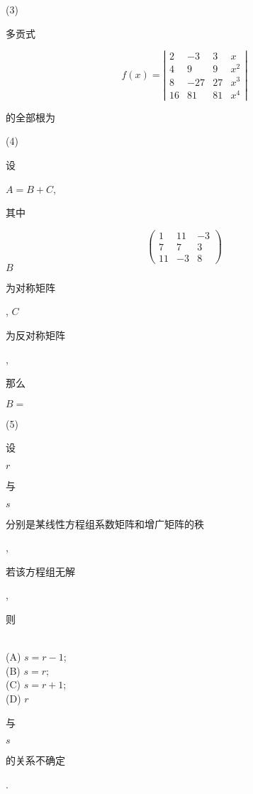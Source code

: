 \documentclass[10pt]{article}
\begin{document}
(3) \begin{CJK}{UTF8}{mj}多贡式\end{CJK}
$$
f(x)=\left|\begin{array}{cccc}
2 & -3 & 3 & x \\
4 & 9 & 9 & x^{2} \\
8 & -27 & 27 & x^{3} \\
16 & 81 & 81 & x^{4}
\end{array}\right|
$$
\begin{CJK}{UTF8}{mj}的全部根为\end{CJK}

(4) \begin{CJK}{UTF8}{mj}设\end{CJK} $A=B+C$, \begin{CJK}{UTF8}{mj}其中\end{CJK}
$$
\left(\begin{array}{ccc}
1 & 11 & -3 \\
7 & 7 & 3 \\
11 & -3 & 8
\end{array}\right)
$$
$B$ \begin{CJK}{UTF8}{mj}为对称矩阵\end{CJK}, $C$ \begin{CJK}{UTF8}{mj}为反对称矩阵\end{CJK}, \begin{CJK}{UTF8}{mj}那么\end{CJK} $B=$

(5) \begin{CJK}{UTF8}{mj}设\end{CJK} $r$ \begin{CJK}{UTF8}{mj}与\end{CJK} $s$ \begin{CJK}{UTF8}{mj}分别是某线性方程组系数矩阵和增广矩阵的秩\end{CJK}, \begin{CJK}{UTF8}{mj}若该方程组无解\end{CJK}, \begin{CJK}{UTF8}{mj}则\end{CJK}\\
(A) $s=r-1$;\\
(B) $s=r$;\\
(C) $s=r+1$;\\
(D) $r$ \begin{CJK}{UTF8}{mj}与\end{CJK} $s$ \begin{CJK}{UTF8}{mj}的关系不确定\end{CJK}.
\end{document}
